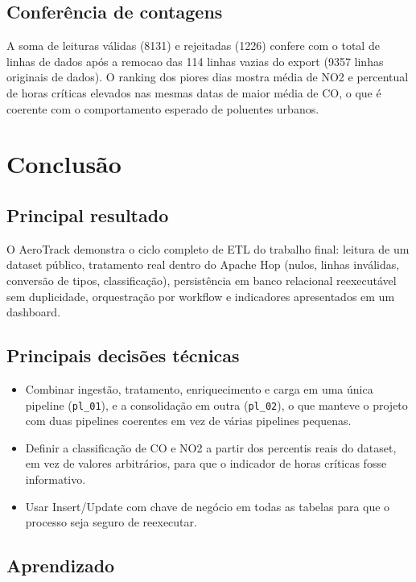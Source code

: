 \documentclass[12pt,a4paper,openany]{report}
\begin{document}
\section{Conferência de contagens}

A soma de leituras válidas (8131) e rejeitadas (1226) confere com o total de
linhas de dados após a remocao das 114 linhas vazias do export (9357 linhas
originais de dados). O ranking dos piores dias mostra média de NO2 e
percentual de horas críticas elevados nas mesmas datas de maior média de CO,
o que é coerente com o comportamento esperado de poluentes urbanos.

\chapter{Conclusão}

\section{Principal resultado}

O AeroTrack demonstra o ciclo completo de ETL do trabalho final: leitura de
um dataset público, tratamento real dentro do Apache Hop (nulos, linhas
inválidas, conversão de tipos, classificação), persistência em banco
relacional reexecutável sem duplicidade, orquestração por workflow e
indicadores apresentados em um dashboard.

\section{Principais decisões técnicas}

\begin{itemize}
  \item Combinar ingestão, tratamento, enriquecimento e carga em uma única
    pipeline (\texttt{pl\_01}), e a consolidação em outra (\texttt{pl\_02}),
    o que manteve o projeto com duas pipelines coerentes em vez de várias
    pipelines pequenas.
  \item Definir a classificação de CO e NO2 a partir dos percentis reais do
    dataset, em vez de valores arbitrários, para que o indicador de horas
    críticas fosse informativo.
  \item Usar Insert/Update com chave de negócio em todas as tabelas para que
    o processo seja seguro de reexecutar.
\end{itemize}

\section{Aprendizado}
\end{document}
